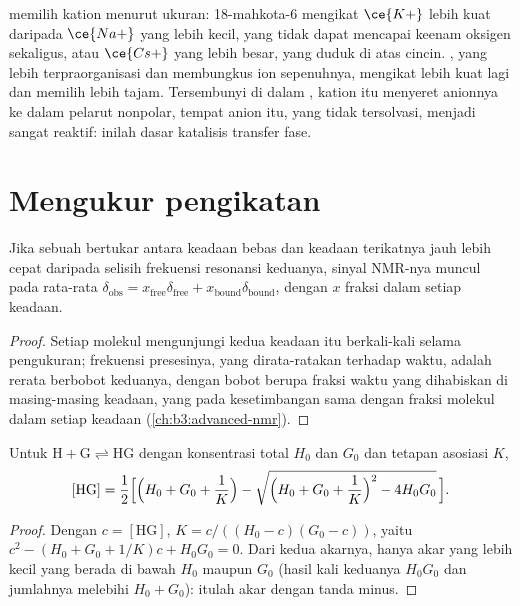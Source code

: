  memilih kation menurut ukuran: 18-mahkota-6 mengikat $\ce{K+}$ lebih kuat daripada
$\ce{Na+}$ yang lebih kecil, yang tidak dapat mencapai keenam oksigen sekaligus, atau $\ce{Cs+}$ yang lebih besar, yang
duduk di atas cincin. , yang lebih terpraorganisasi dan membungkus ion
sepenuhnya, mengikat lebih kuat lagi dan memilih lebih tajam. Tersembunyi di dalam
, kation itu menyeret anionnya ke dalam pelarut nonpolar, tempat anion itu,
yang tidak tersolvasi, menjadi sangat reaktif: inilah dasar katalisis transfer fase.

\section{Mengukur pengikatan}

\begin{proposition}\label{prop:b3:supramolecular:fast-exchange}
Jika sebuah  bertukar antara keadaan bebas dan keadaan terikatnya jauh lebih cepat daripada
selisih frekuensi resonansi keduanya, sinyal NMR-nya muncul pada rata-rata
$\delta_{\mathrm{obs}} = x_{\mathrm{free}}\delta_{\mathrm{free}} + x_{\mathrm{bound}}\delta_{\mathrm{bound}}$, dengan $x$ fraksi  dalam setiap keadaan.
\end{proposition}

\begin{proof}
Setiap molekul  mengunjungi kedua keadaan itu berkali-kali selama pengukuran;
frekuensi presesinya, yang dirata-ratakan terhadap waktu, adalah rerata berbobot keduanya, dengan
bobot berupa fraksi waktu yang dihabiskan di masing-masing keadaan, yang pada kesetimbangan sama dengan
fraksi molekul dalam setiap keadaan (\cref{ch:b3:advanced-nmr}).
\end{proof}

\begin{theorem}\label{thm:b3:supramolecular:isotherm}
Untuk $\mathrm{H + G \rightleftharpoons HG}$ dengan konsentrasi total $H_0$ dan $G_0$ dan tetapan asosiasi $K$,
\[
  [\mathrm{HG}] = \frac{1}{2}\Bigl[\Bigl(H_0 + G_0 + \frac1K\Bigr) - \sqrt{\Bigl(H_0 + G_0 + \frac1K\Bigr)^2 - 4H_0G_0}\,\Bigr].
\]
\end{theorem}

\begin{proof}
Dengan $c = [\mathrm{HG}]$, $K = c/((H_0 - c)(G_0 - c))$, yaitu $c^2 - (H_0 + G_0 + 1/K)c + H_0G_0 = 0$. Dari kedua akarnya,
hanya akar yang lebih kecil yang berada di bawah $H_0$ maupun $G_0$ (hasil kali keduanya $H_0G_0$ dan jumlahnya
melebihi $H_0 + G_0$): itulah akar dengan tanda minus.
\end{proof}

